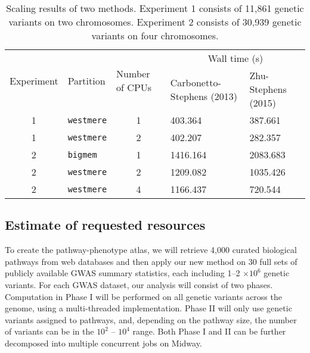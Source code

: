 \documentclass[10pt]{article}
\begin{document}
\begin{table}[h]
\centering
\begin{tabular}{clcll}
\hline
\multicolumn{1}{l}{\multirow{2}{*}{Experiment}} & \multirow{2}{*}{Partition} & \multicolumn{1}{l}{\multirow{2}{*}{Number of CPUs}} & \multicolumn{2}{c}{Wall time (s)}                \\
\multicolumn{1}{l}{}                            &                            & \multicolumn{1}{l}{}                                & Carbonetto-Stephens (2013) & Zhu-Stephens (2015) \\
\hline
1                                               & \texttt{westmere}                   & 1                                                   & 403.364                    & 387.661             \\
1                                               & \texttt{westmere}                   & 2                                                   & 402.207                    & 282.357             \\
2                                               & \texttt{bigmem}                     & 1                                                   & 1416.164                   & 2083.683            \\
2                                               & \texttt{westmere}                   & 2                                                   & 1209.082                   & 1035.426            \\
2                                               & \texttt{westmere}                   & 4
 & 1166.437                   & 720.544 \\
\hline
\end{tabular}
\caption{Scaling results of two methods. Experiment 1 consists of
  11,861 genetic variants on two chromosomes. Experiment 2 consists of
  30,939 genetic variants on four chromosomes.\label{scale}}
\end{table}

\subsection*{Estimate of requested
resources}\label{xiang-estimate-of-requested-resources}

To create the pathway-phenotype atlas, we will retrieve 4,000 curated
biological pathways from web databases and then apply our new method
on 30 full sets of publicly available GWAS summary statistics, each
including 1--2 $ \times 10^6 $ genetic variants. For each GWAS
dataset, our analysis will consist of two phases. Computation in Phase
I will be performed on all genetic variants across the genome, using a
multi-threaded implementation. Phase II will only use genetic variants
assigned to pathways, and, depending on the pathway size, the number
of variants can be in the $ 10^2 $ -- $ 10^4 $ range. Both Phase I and
II can be further decomposed into multiple concurrent jobs on Midway.
\end{document}
